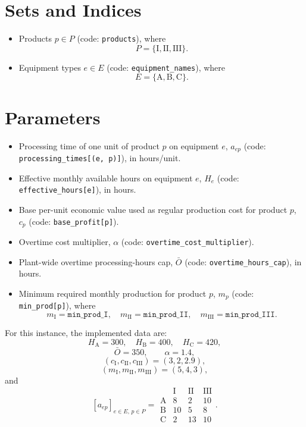\section*{Sets and Indices}

\begin{itemize}
    \item Products $p \in P$ (code: \texttt{products}), where
    \[
    P=\{\mathrm{I},\mathrm{II},\mathrm{III}\}.
    \]
    \item Equipment types $e \in E$ (code: \texttt{equipment\_names}), where
    \[
    E=\{\mathrm{A},\mathrm{B},\mathrm{C}\}.
    \]
\end{itemize}

\section*{Parameters}

\begin{itemize}
    \item Processing time of one unit of product $p$ on equipment $e$, $a_{ep}$ (code: \texttt{processing\_times[(e, p)]}), in hours/unit.
    \item Effective monthly available hours on equipment $e$, $H_e$ (code: \texttt{effective\_hours[e]}), in hours.
    \item Base per-unit economic value used as regular production cost for product $p$, $c_p$ (code: \texttt{base\_profit[p]}).
    \item Overtime cost multiplier, $\alpha$ (code: \texttt{overtime\_cost\_multiplier}).
    \item Plant-wide overtime processing-hours cap, $\bar{O}$ (code: \texttt{overtime\_hours\_cap}), in hours.
    \item Minimum required monthly production for product $p$, $m_p$ (code: \texttt{min\_prod[p]}), where
    \[
    m_{\mathrm{I}}=\texttt{min\_prod\_I},\quad
    m_{\mathrm{II}}=\texttt{min\_prod\_II},\quad
    m_{\mathrm{III}}=\texttt{min\_prod\_III}.
    \]
\end{itemize}

For this instance, the implemented data are:
\[
H_{\mathrm{A}}=300,\quad H_{\mathrm{B}}=400,\quad H_{\mathrm{C}}=420,
\]
\[
\bar{O}=350,\qquad \alpha=1.4,
\]
\[
(c_{\mathrm{I}},c_{\mathrm{II}},c_{\mathrm{III}})=(3,2,2.9),
\]
\[
(m_{\mathrm{I}},m_{\mathrm{II}},m_{\mathrm{III}})=(5,4,3),
\]
and
\[
[a_{ep}]_{e \in E,\, p \in P}
=
\begin{array}{c|ccc}
 & \mathrm{I} & \mathrm{II} & \mathrm{III}\\ \hline
\mathrm{A} & 8 & 2 & 10\\
\mathrm{B} & 10 & 5 & 8\\
\mathrm{C} & 2 & 13 & 10
\end{array}.
\]

